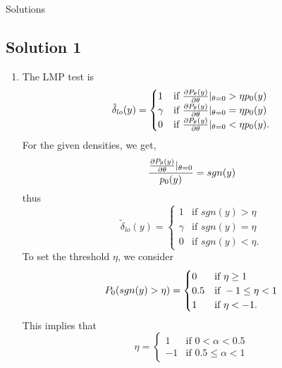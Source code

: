 \documentclass[a4paper,english,12pt]{article}
\begin{document}
\newpage
\par{\centering\Large {Solutions}\par}
\hypertarget{solution1}{\subsection*{Solution 1}}
\begin{enumerate}[label=(\alph*).]
\item The LMP test is
\begin{equation*}
\tilde{\delta}_{lo}(y) =
\begin{cases}
		1  & \mbox{if } \frac{\partial \mathnormal{P}_{\theta}(y)}{\partial \theta} |_{\theta=0}>\eta \mathnormal{p}_0(y)\\
		\gamma & \mbox{if } \frac{\partial \mathnormal{P}_{\theta}(y)}{\partial \theta} |_{\theta=0}=\eta \mathnormal{p}_0(y)\\
		0 & \mbox{if } \frac{\partial \mathnormal{P}_{\theta}(y)}{\partial \theta} |_{\theta=0}<\eta \mathnormal{p}_0(y).
\end{cases}
\end{equation*}
For the given densities, we get,
\begin{equation*}
\frac{\frac{\partial \mathnormal{P}_{\theta}(y)}{\partial \theta} |_{\theta=0}}{\mathnormal{p}_0(y)}= sgn(y)
\end{equation*}
thus
\begin{equation*}
\tilde{\delta}_{lo}(y) =
\begin{cases}
		1  & \mbox{if } sgn(y)>\eta\\
		\gamma & \mbox{if } sgn(y)=\eta\\
		0 & \mbox{if } sgn(y)<\eta.
\end{cases}
\end{equation*}
To set the threshold $\eta$, we consider
\begin{equation*}
\mathnormal{P}_0(sgn(y)>\eta) =
\begin{cases}
		0  & \mbox{if } \eta \geq 1\\
		0.5 & \mbox{if } -1 \leq \eta < 1\\
		1 & \mbox{if } \eta <-1.
\end{cases}
\end{equation*}
This implies that
\begin{equation*}
\eta =
\begin{cases}
		1  & \mbox{if } 0<\alpha<0.5\\
		-1 & \mbox{if } 0.5\leq \alpha < 1
\end{cases}

\end{equation*}
\end{enumerate}
\end{document}
